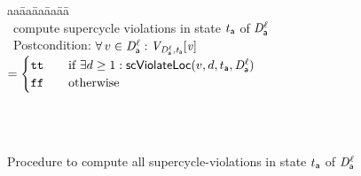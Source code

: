 \begin{figure}[ht]

\setcounter{lctr}{0}
\begin{tabbing}\label{alg:compute-scViol}
aa\= aa\= aa\= aa\= aa\=\kill
{}\\
\cmnt\ compute supercycle violations in state $t_{\mathsf{a}}$ of $\mathit{D}_{\mathsf{a}}^{\ell}$\\
\cmnt\ Postcondition: $\forall\, v \in \mathit{D}_{\mathsf{a}}^{\ell}: \mathit{V_{\mathit{D}_{\mathsf{a}}^{\ell},t_{\mathsf{a}}} [v ]}$ 
$ =
  \begin{cases}
    \textup{\texttt{tt}}     & \quad \text{if }  \exists d \geq 1: \mathsf{scViolateLoc}(v,d,t_{\mathsf{a}},\mathit{D}_{\mathsf{a}}^{\ell})\\
    \textup{\texttt{ff}}  & \quad \text{otherwise}\\
  \end{cases}
$
\\
 \\


       \lit{\FI}
\lio{\ENDFOR}\\


    \lih{\FI}
  \lit{\ENDFOR}
\lion{\ENDWHILE} 
\end{tabbing}
\vspace{-3ex}
\caption{Procedure to compute all supercycle-violations in state $t_{\mathsf{a}}$ of $\mathit{D}_{\mathsf{a}}^{\ell}$}
\label{fig:computeSCViolateLocDSK}
\label{fig:computeSCViolateLoc}
\end{figure}

